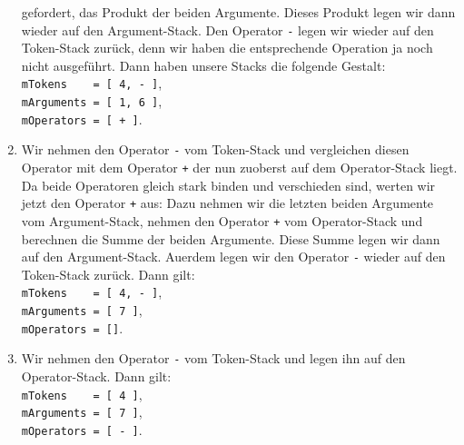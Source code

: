 \begin{enumerate}
      gefordert, das Produkt der beiden Argumente. Dieses Produkt legen wir dann wieder auf
      den Argument-Stack.  Den Operator \texttt{-} legen wir wieder
      auf den Token-Stack zur\"uck, denn wir haben die entsprechende Operation ja noch nicht
      ausgef\"uhrt.   
      Dann haben unsere Stacks die folgende Gestalt: \\[0.1cm]
      \hspace*{1.3cm} \texttt{mTokens \ \ \ = [ 4, - ]}, \\[0.1cm]
      \hspace*{1.3cm} \texttt{mArguments = [ 1, 6 ]}, \\[0.1cm]
      \hspace*{1.3cm} \texttt{mOperators = [ + ]}. 
\item Wir nehmen den Operator \texttt{-} vom Token-Stack und
      vergleichen diesen Operator mit dem Operator \texttt{+} der nun zuoberst auf dem Operator-Stack liegt.
      Da beide Operatoren gleich stark binden und verschieden sind, werten wir jetzt den Operator
      \texttt{+} aus:  Dazu nehmen wir die letzten beiden Argumente vom Argument-Stack, nehmen den Operator
      \texttt{+} vom Operator-Stack und berechnen die Summe der beiden Argumente.
      Diese Summe legen wir dann auf den Argument-Stack.  Au\3erdem legen wir den Operator
      \texttt{-} wieder auf den Token-Stack zur\"uck.      
      Dann gilt: \\[0.1cm]
      \hspace*{1.3cm} \texttt{mTokens \ \ \ = [ 4, - ]}, \\[0.1cm]
      \hspace*{1.3cm} \texttt{mArguments = [ 7 ]}, \\[0.1cm]
      \hspace*{1.3cm} \texttt{mOperators = []}. 
\item Wir nehmen  den Operator \texttt{-} vom Token-Stack und legen
      ihn auf den Operator-Stack.
      Dann gilt: \\[0.1cm]
      \hspace*{1.3cm} \texttt{mTokens \ \ \ = [ 4 ]}, \\[0.1cm]
      \hspace*{1.3cm} \texttt{mArguments = [ 7 ]}, \\[0.1cm]
      \hspace*{1.3cm} \texttt{mOperators = [ - ]}. 

\end{enumerate}
